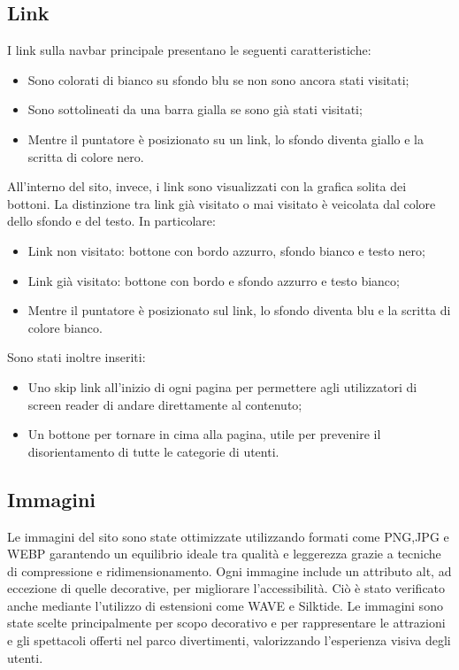 \subsection{Link}
I link sulla navbar principale presentano le seguenti caratteristiche:
\begin{itemize}
    \item Sono colorati di bianco su sfondo blu se non sono ancora stati visitati;
    \item Sono sottolineati da una barra gialla se sono già stati visitati;
    \item Mentre il puntatore è posizionato su un link, lo sfondo diventa giallo e la scritta di colore nero.
\end{itemize}
All'interno del sito, invece, i link sono visualizzati con la grafica solita dei bottoni. La distinzione tra link già visitato o mai visitato è veicolata dal colore dello sfondo e del testo. In particolare:
\begin{itemize}
    \item Link non visitato: bottone con bordo azzurro, sfondo bianco e testo nero;
    \item Link già visitato: bottone con bordo e sfondo azzurro e testo bianco;
    \item Mentre il puntatore è posizionato sul link, lo sfondo diventa blu e la scritta di colore bianco.
\end{itemize}
Sono stati inoltre inseriti:
\begin{itemize}
    \item Uno skip link all'inizio di ogni pagina per permettere agli utilizzatori di screen reader di andare direttamente al contenuto;
    \item Un bottone per tornare in cima alla pagina, utile per prevenire il disorientamento di tutte le categorie di utenti.
\end{itemize}
\subsection{Immagini}
Le immagini del sito sono state ottimizzate utilizzando formati come PNG,JPG e WEBP garantendo un equilibrio ideale tra qualità e leggerezza grazie a tecniche di compressione e ridimensionamento. Ogni immagine include un attributo alt, ad eccezione di quelle decorative, per migliorare l’accessibilità. Ciò è stato verificato anche mediante l'utilizzo di estensioni come WAVE e Silktide. Le immagini sono state scelte principalmente per scopo decorativo e per rappresentare le attrazioni e gli spettacoli offerti nel  parco divertimenti, valorizzando l’esperienza visiva degli utenti.
